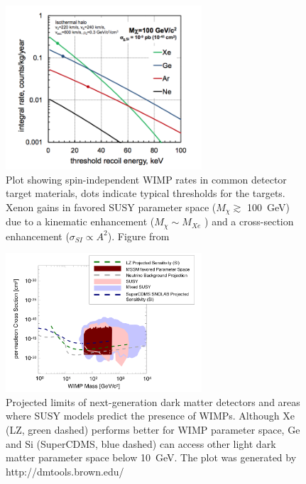 \begin{figure}[htbp]
\begin{center}
\includegraphics[width=0.65\textwidth]{figures/lxetpcs/wimp_rates.png}
\caption{Plot showing spin-independent WIMP rates in common detector target materials, dots indicate typical thresholds for the targets. Xenon gains in favored SUSY parameter space ($M_{\chi} \gtrsim$ 100~GeV) due to a kinematic enhancement ($M_{\chi} \sim M_{Xe}$ ) and a cross-section enhancement ($\sigma_{SI} \propto A^{2}$). Figure from \cite{Chepel2013}}
\label{fig:wimp_rates}
\end{center}
\end{figure}

\begin{figure}[htbp]
\begin{center}
\includegraphics[width=0.65\textwidth]{figures/lxetpcs/WIMPblobs.png}
\caption{Projected limits of next-generation dark matter detectors and areas where SUSY models predict the presence of WIMPs. Although Xe (LZ, green dashed) performs better for WIMP parameter space, Ge and Si (SuperCDMS, blue dashed) can access other light dark matter parameter space below 10~GeV. The plot was generated by http://dmtools.brown.edu/ }
\label{fig:WIMPblobs}
\end{center}
\end{figure}




